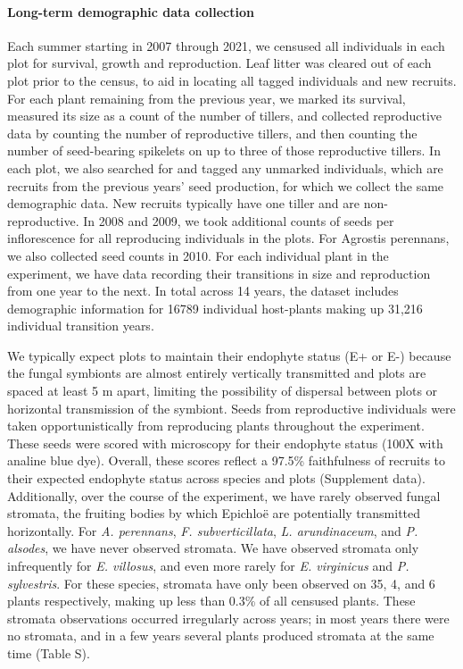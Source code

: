 \documentclass[12pt]{article}
\begin{document}
\paragraph*{Long-term demographic data collection}
Each summer starting in 2007 through 2021, we censused all individuals in each plot for survival, growth and reproduction. 
Leaf litter was cleared out of each plot prior to the census, to aid in locating all tagged individuals and new recruits.
For each plant remaining from the previous year, we marked its survival, measured its size as a count of the number of tillers, and collected reproductive data by counting the number of reproductive tillers, and then counting the number of seed-bearing spikelets on up to three of those reproductive tillers. 
In each plot, we also searched for and tagged any unmarked individuals, which are recruits from the previous years' seed production, for which we collect the same demographic data.
New recruits typically have one tiller and are non-reproductive. 
In 2008 and 2009, we took additional counts of seeds per inflorescence for all reproducing individuals in the plots. 
For Agrostis perennans, we also collected seed counts in 2010.
For each individual plant in the experiment, we have data recording their transitions in size and reproduction from one year to the next. 
In total across 14 years, the dataset includes demographic information for 16789 individual host-plants making up 31,216 individual transition years.

We typically expect plots to maintain their endophyte status (E+ or E-) because the fungal symbionts are almost entirely vertically transmitted and plots are {\color{red}spaced at least 5 m apart}, limiting the possibility of dispersal between plots or horizontal transmission of the symbiont. 
Seeds from reproductive individuals were taken opportunistically from reproducing plants throughout the experiment. 
These seeds were scored with microscopy for their endophyte status  (100X with analine blue dye).  
Overall, these scores reflect a 97.5\% faithfulness of recruits to their expected endophyte status across species and plots (Supplement data). 
Additionally, over the course of the experiment, we have rarely observed fungal stromata, the fruiting bodies by which Epichlo\"e are potentially transmitted horizontally. 
For \emph{A. perennans}, \emph{F. subverticillata}, \emph{L. arundinaceum}, and \emph{P. alsodes}, we have never observed stromata. 
We have observed stromata only infrequently for \emph{E. villosus}, and even more rarely for \emph{E. virginicus} and \emph{P. sylvestris}. 
For these species, stromata have only been observed on 35, 4, and 6 plants respectively, making up less than 0.3\% of all censused plants.
These stromata observations occurred irregularly across years; in most years there were no stromata, and in a few years several plants produced stromata at the same time (Table S). 
\end{document}
